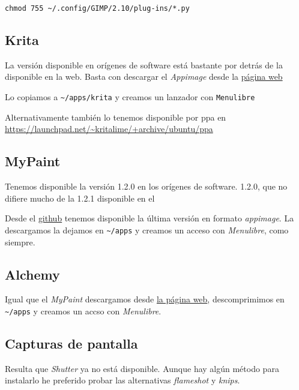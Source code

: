 \documentclass[
  12pt,
  spanish,
]{article}
\begin{document}
\begin{verbatim}
chmod 755 ~/.config/GIMP/2.10/plug-ins/*.py
\end{verbatim}

\hypertarget{krita}{%
\subsection{Krita}\label{krita}}

La versión disponible en orígenes de software está bastante por detrás
de la disponible en la web. Basta con descargar el \emph{Appimage} desde
la \href{https://krita.org}{página web}

Lo copiamos a \texttt{\textasciitilde{}/apps/krita} y creamos un
lanzador con \texttt{Menulibre}

Alternativamente también lo tenemos disponible por ppa en
\url{https://launchpad.net/~kritalime/+archive/ubuntu/ppa}

\hypertarget{mypaint}{%
\subsection{MyPaint}\label{mypaint}}

Tenemos disponible la versión 1.2.0 en los orígenes de software. 1.2.0,
que no difiere mucho de la 1.2.1 disponible en el

Desde el \href{https://github.com/mypaint/}{github} tenemos disponible
la última versión en formato \emph{appimage}. La descargamos la dejamos
en \texttt{\textasciitilde{}/apps} y creamos un acceso con
\emph{Menulibre}, como siempre.

\hypertarget{alchemy}{%
\subsection{Alchemy}\label{alchemy}}

Igual que el \emph{MyPaint} descargamos desde
\href{http://al.chemy.org}{la página web}, descomprimimos en
\texttt{\textasciitilde{}/apps} y creamos un accso con \emph{Menulibre}.

\hypertarget{capturas-de-pantalla}{%
\subsection{Capturas de pantalla}\label{capturas-de-pantalla}}

Resulta que \emph{Shutter} ya no está disponible. Aunque hay algún
método para instalarlo he preferido probar las alternativas
\emph{flameshot} y \emph{knips}.
\end{document}
